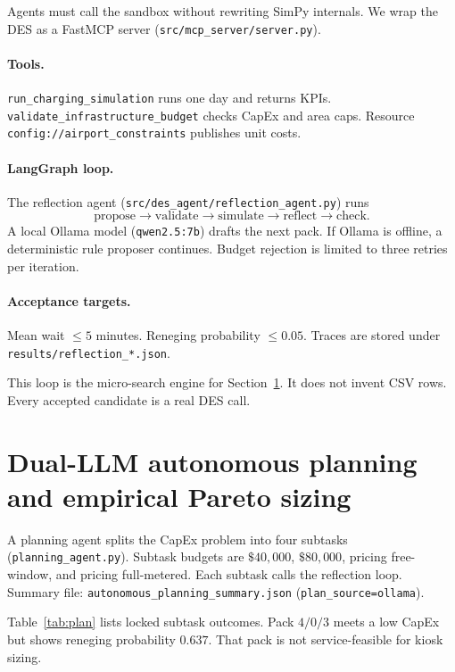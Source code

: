 \documentclass[11pt]{article}
\begin{document}
Agents must call the sandbox without rewriting SimPy internals.
We wrap the DES as a FastMCP server
(\texttt{src/mcp\_server/server.py}).

\paragraph{Tools.}
\texttt{run\_charging\_simulation} runs one day and returns KPIs.
\texttt{validate\_infrastructure\_budget} checks CapEx and area caps.
Resource \texttt{config://airport\_constraints} publishes unit costs.

\paragraph{LangGraph loop.}
The reflection agent
(\texttt{src/des\_agent/reflection\_agent.py}) runs
\[
\mathrm{propose}\to\mathrm{validate}\to\mathrm{simulate}
\to\mathrm{reflect}\to\mathrm{check}.
\]
A local Ollama model (\texttt{qwen2.5:7b}) drafts the next pack.
If Ollama is offline, a deterministic rule proposer continues.
Budget rejection is limited to three retries per iteration.

\paragraph{Acceptance targets.}
Mean wait $\le 5$ minutes.
Reneging probability $\le 0.05$.
Traces are stored under \texttt{results/reflection\_*.json}.

This loop is the micro-search engine for Section~\ref{sec:pareto}.
It does not invent CSV rows.
Every accepted candidate is a real DES call.


\section{Dual-LLM autonomous planning and empirical Pareto sizing}
\label{sec:pareto}

A planning agent splits the CapEx problem into four subtasks
(\texttt{planning\_agent.py}).
Subtask budgets are $\$40{,}000$, $\$80{,}000$, pricing free-window,
and pricing full-metered.
Each subtask calls the reflection loop.
Summary file: \texttt{autonomous\_planning\_summary.json}
(\texttt{plan\_source=ollama}).

Table~\ref{tab:plan} lists locked subtask outcomes.
Pack $4/0/3$ meets a low CapEx but shows reneging probability $0.637$.
That pack is not service-feasible for kiosk sizing.
\end{document}
